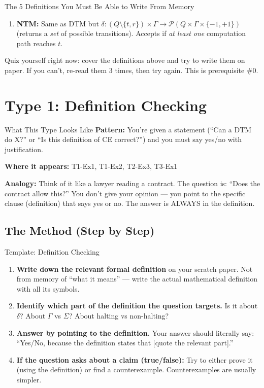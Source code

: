\documentclass[11pt,a4paper]{article}
\newcommand{\keytakeaway}[1]{%
  \par\vspace{0.3em}%
  \colorbox{yellow!60}{\parbox{\dimexpr\linewidth-2\fboxsep}{#1}}%
  \vspace{0.3em}}
\begin{document}
\begin{conceptbox}{The 5 Definitions You Must Be Able to Write From Memory}
\begin{enumerate}
    \item \textbf{NTM:} Same as DTM but $\delta : (Q \setminus \{t,r\}) \times \Gamma \to \mathcal{P}(Q \times \Gamma \times \{-1, +1\})$ (returns a \emph{set} of possible transitions). Accepts if \emph{at least one} computation path reaches $t$.
\end{enumerate}

\keytakeaway{Quiz yourself right now: cover the definitions above and try to write them on paper. If you can't, re-read them 3 times, then try again. This is prerequisite \#0.}
\end{conceptbox}

\newpage
\section{Type 1: Definition Checking}

\begin{notebox}{What This Type Looks Like}
\textbf{Pattern:} You're given a statement (``Can a DTM do X?'' or ``Is this definition of CE correct?'') and you must say yes/no with justification.

\textbf{Where it appears:} T1-Ex1, T1-Ex2, T2-Ex3, T3-Ex1

\textbf{Analogy:} Think of it like a lawyer reading a contract. The question is: ``Does the contract allow this?'' You don't give your opinion --- you point to the specific clause (definition) that says yes or no. The answer is ALWAYS in the definition.
\end{notebox}

\subsection{The Method (Step by Step)}

\begin{templatebox}{Template: Definition Checking}
\begin{enumerate}
    \item \textbf{Write down the relevant formal definition} on your scratch paper. Not from memory of ``what it means'' --- write the actual mathematical definition with all its symbols.

    \item \textbf{Identify which part of the definition the question targets.} Is it about $\delta$? About $\Gamma$ vs $\Sigma$? About halting vs non-halting?

    \item \textbf{Answer by pointing to the definition.} Your answer should literally say: ``Yes/No, because the definition states that [quote the relevant part].''

    \item \textbf{If the question asks about a claim (true/false):} Try to either prove it (using the definition) or find a counterexample. Counterexamples are usually simpler.
\end{enumerate}
\end{templatebox}
\end{document}
